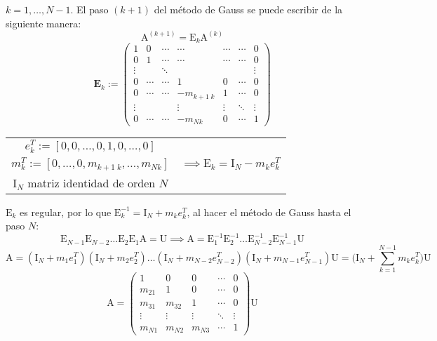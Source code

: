 \documentclass{article}
\begin{document}
$k=1,\dots,N-1$. El paso $(k+1)$ del método de Gauss se puede escribir de la siguiente manera: 
$$\text{A}^{(k+1)}=\text{E}_k\text{A}^{(k)}$$
$$\textbf{E}_k:=\begin{pmatrix}
1 & 0 & \cdots & \cdots & \cdots & \cdots & 0 \\
0 & 1 & \cdots & \cdots & \cdots & \cdots & 0 \\
\vdots & & \ddots & & & & \vdots \\
0 & \cdots & \cdots & 1 & 0 & \cdots & 0 \\
0 & \cdots & \cdots & -m_{k+1\;k} & 1 & \cdots & 0 \\
\vdots & & & \vdots & \vdots & \ddots & \vdots \\
0 & \cdots & \cdots & -m_{Nk} & 0 & \cdots & 1
\end{pmatrix}$$
\begin{center}\begin{tabular}{ c | c }
$e_k^T:=[0,0,\dots,0,1,0,\dots,0]$ & \\
$m_k^T:=[0,\dots,0,m_{k+1\;k},\dots,m_{Nk}]$ & $\implies \text{E}_k=\text{I}_N-m_ke_k^T$\\
$\text{I}_N$ matriz identidad de orden $N$ & 
\end{tabular}

$\text{E}_k$ es regular, por lo que $\text{E}_k^{-1}=\text{I}_N+m_ke_k^T$, al hacer el método de Gauss hasta el paso $N$:
$$\text{E}_{N-1}\text{E}_{N-2}\dots\text{E}_{2}\text{E}_{1}\text{A}=\text{U}\implies\text{A}=\text{E}_{1}^{-1}\text{E}_{2}^{-1}\dots\text{E}_{N-2}^{-1}\text{E}_{N-1}^{-1}\text{U}$$
$$\text{A}=(\text{I}_N+m_{1}e_{1}^T)(\text{I}_N+m_{2}e_{2}^T)\dots(\text{I}_N+m_{N-2}e_{N-2}^T)(\text{I}_N+m_{N-1}e_{N-1}^T)\text{U}=\bigg(\text{I}_N+\sum_{k=1}^{N-1}m_ke_k^T\bigg)\text{U}$$
$$\text{A}=\begin{pmatrix}
1 & 0 & 0 & \cdots & 0 \\
m_{21} & 1 & 0 & \cdots & 0 \\
m_{31} & m_{32} & 1 & \cdots & 0 \\
\vdots & \vdots & \vdots & \ddots & \vdots \\
m_{N1} & m_{N2} & m_{N3} & \cdots & 1
\end{pmatrix}\text{U}$$ 
\end{center}
\end{document}
